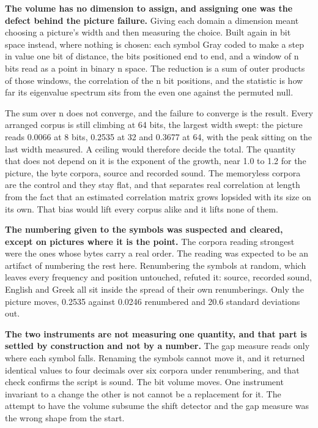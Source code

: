 \textbf{The volume has no dimension to assign, and assigning one was the defect behind the picture failure.} Giving each domain a dimension meant choosing a picture's width and then measuring the choice. Built again in bit space instead, where nothing is chosen: each symbol Gray coded to make a step in value one bit of distance, the bits positioned end to end, and a window of n bits read as a point in binary n space. The reduction is a sum of outer products of those windows, the correlation of the n bit positions, and the statistic is how far its eigenvalue spectrum sits from the even one against the permuted null.

The sum over n does not converge, and the failure to converge is the result. Every arranged corpus is still climbing at 64 bits, the largest width swept: the picture reads 0.0066 at 8 bits, 0.2535 at 32 and 0.3677 at 64, with the peak sitting on the last width measured. A ceiling would therefore decide the total. The quantity that does not depend on it is the exponent of the growth, near 1.0 to 1.2 for the picture, the byte corpora, source and recorded sound. The memoryless corpora are the control and they stay flat, and that separates real correlation at length from the fact that an estimated correlation matrix grows lopsided with its size on its own. That bias would lift every corpus alike and it lifts none of them.

\textbf{The numbering given to the symbols was suspected and cleared, except on pictures where it is the point.} The corpora reading strongest were the ones whose bytes carry a real order. The reading was expected to be an artifact of numbering the rest here. Renumbering the symbols at random, which leaves every frequency and position untouched, refuted it: source, recorded sound, English and Greek all sit inside the spread of their own renumberings. Only the picture moves, 0.2535 against 0.0246 renumbered and 20.6 standard deviations out.

\textbf{The two instruments are not measuring one quantity, and that part is settled by construction and not by a number.} The gap measure reads only where each symbol falls. Renaming the symbols cannot move it, and it returned identical values to four decimals over six corpora under renumbering, and that check confirms the script is sound. The bit volume moves. One instrument invariant to a change the other is not cannot be a replacement for it. The attempt to have the volume subsume the shift detector and the gap measure was the wrong shape from the start.

